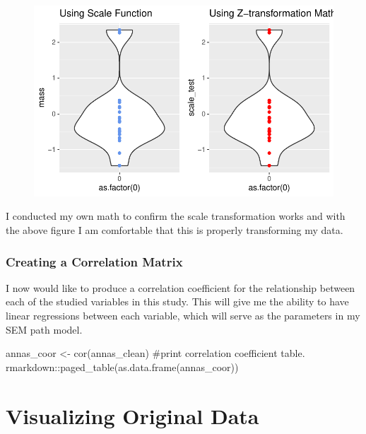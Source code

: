 \documentclass[
  letterpaper,
  DIV=11,
  numbers=noendperiod]{scrartcl}
\newenvironment{Shaded}{\begin{snugshade}}{\end{snugshade}}
\newcommand{\CommentTok}[1]{\textcolor[rgb]{0.37,0.37,0.37}{#1}}
\newcommand{\FunctionTok}[1]{\textcolor[rgb]{0.28,0.35,0.67}{#1}}
\newcommand{\NormalTok}[1]{\textcolor[rgb]{0.00,0.23,0.31}{#1}}
\newcommand{\OtherTok}[1]{\textcolor[rgb]{0.00,0.23,0.31}{#1}}
\newcommand{\SpecialCharTok}[1]{\textcolor[rgb]{0.37,0.37,0.37}{#1}}
\begin{document}
\begin{figure}[H]

{\centering \includegraphics{Phenotype_to_permformance_model_files/figure-pdf/unnamed-chunk-4-1.pdf}

}

\end{figure}

I conducted my own math to confirm the scale transformation works and
with the above figure I am comfortable that this is properly
transforming my data.

\hypertarget{creating-a-correlation-matrix}{%
\subsubsection{Creating a Correlation
Matrix}\label{creating-a-correlation-matrix}}

I now would like to produce a correlation coefficient for the
relationship between each of the studied variables in this study. This
will give me the ability to have linear regressions between each
variable, which will serve as the parameters in my SEM path model.

\begin{Shaded}
\begin{Highlighting}[]
\NormalTok{annas\_coor }\OtherTok{\textless{}{-}} \FunctionTok{cor}\NormalTok{(annas\_clean)}
\CommentTok{\#print correlation coefficient table. }
\NormalTok{rmarkdown}\SpecialCharTok{::}\FunctionTok{paged\_table}\NormalTok{(}\FunctionTok{as.data.frame}\NormalTok{(annas\_coor))}
\end{Highlighting}
\end{Shaded}

\hypertarget{visualizing-original-data}{%
\section{Visualizing Original Data}\label{visualizing-original-data}}
\end{document}
